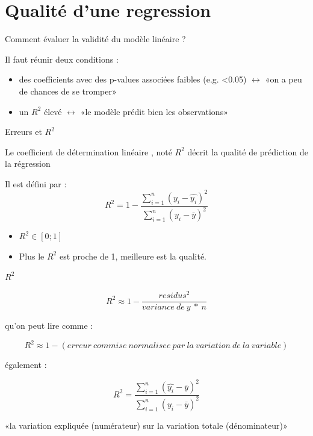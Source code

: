 \documentclass{beamer}
\begin{document}
\section{Qualité d'une regression}


\begin{frame}{Comment évaluer la validité du modèle linéaire  ?}

Il faut réunir deux conditions : 

\begin{itemize}
\item des coefficients avec des \alert{p-values} associées \alert{faibles} (e.g. <0.05)  $\leftrightarrow$ «on a peu de chances de se tromper»
\item un \alert{$R^2$} élevé  $\leftrightarrow$ «le modèle prédit bien les observations»
\end{itemize}


\end{frame}


\begin{frame}{Erreurs et  $R^2$}


Le \alert{coefficient de détermination linéaire} ,  noté $R^2$   décrit la \alert{qualité de prédiction} de la régression


Il est défini par : 
 $$R^2  = 1 - \frac{\sum_{i=1}^{n} (y_i - \hat{y_i})^2}{\sum_{i=1}^{n} (y_i - \bar{y})^2}$$


\begin{itemize}
\item $R^2 \in [0;1]$
\item Plus le $R^2$ est proche de 1, meilleure est la qualité.
\end{itemize}


\end{frame}





\begin{frame}{$R^2$}




$$R^2 \approx 1- \frac{residus^2}{variance\ de\ y\ *\ n}$$

qu'on peut lire comme : 

$$R^2 \approx 1- (erreur\ commise\ normalisee\ par\ la\ variation\ de\ la\ variable )$$

également :

$$R^2  =  \frac{\sum_{i=1}^{n} (\hat{y_i} -\bar{y} )^2}{\sum_{i=1}^{n} (y_i - \bar{y})^2}$$
\begin{scriptsize}
«la variation expliquée (numérateur)  sur la variation totale (dénominateur)»
\end{scriptsize}

\end{frame}
\end{document}

